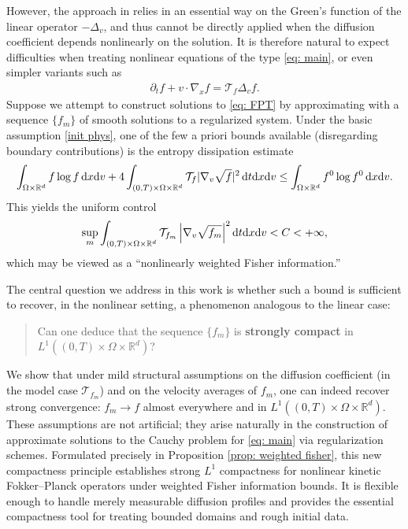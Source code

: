 \documentclass[10pt, reqno]{amsart}
\theoremstyle{plain}
\theoremstyle{definition}
\theoremstyle{remark}
\numberwithin{equation}{section}
\newcommand{\calT}{\mathcal T}
\newcommand{\p}{\partial}
\newcommand{\R}{\mathbb{R}}
\newcommand{\dx}{\textnormal{d}x}
\newcommand{\dv}{\textnormal{d}v}
\newcommand{\dt}{\textnormal{d}t}
\newcommand{\lt}{\left}
\newcommand{\rt}{\right}
\begin{document}
However, the approach in \cite{DL88FKB} relies in an essential way on the Green's function of the linear operator $-\Delta_v$, and thus cannot be directly applied when the diffusion coefficient depends nonlinearly on the solution. It is therefore natural to expect difficulties when treating nonlinear equations of the type \eqref{eq: main}, or even simpler variants such as
\begin{align}\label{eq: FPT}
    \p_t f + v\cdot \nabla_x f = \calT_f \Delta_v f.
\end{align}
Suppose we attempt to construct solutions to \eqref{eq: FPT} by approximating with a sequence $\{f_m\}$ of smooth solutions to a regularized system. Under the basic assumption \eqref{init phys}, one of the few a priori bounds available (disregarding boundary contributions) is the entropy dissipation estimate
\[
    \int_{\Omega\times\R^d} f\log f \,\dx\dv + 4 \int_{(0,T)\times\Omega\times\R^d} \calT_f |\nabla_v \sqrt{f}|^2 \,\dt\dx\dv \le \int_{\Omega\times\R^d} f^0 \log f^0 \,\dx\dv.
\]
This yields the uniform control
\[
    \sup_m \int_{(0,T)\times\Omega\times\R^d} \calT_{f_m} \lt|\nabla_v \sqrt{f_m} \rt|^2 \dt\dx\dv < C < +\infty,
\]
which may be viewed as a ``nonlinearly weighted Fisher information.''

The central question we address in this work is whether such a bound is sufficient to recover, in the nonlinear setting, a phenomenon analogous to the linear case:
\begin{quote}
Can one deduce that the sequence $\{f_m\}$ is \textbf{strongly compact} in $L^1((0,T)\times\Omega\times\R^d)$?
\end{quote}
 
We show that under mild structural assumptions on the diffusion coefficient (in the model case $\calT_{f_m}$) and on the velocity averages of $f_m$, one can indeed recover strong convergence: $f_m \to f$ almost everywhere and in $L^1((0,T)\times \Omega \times \R^d)$. These assumptions are not artificial; they arise naturally in the construction of approximate solutions to the Cauchy problem for \eqref{eq: main} via regularization schemes. Formulated precisely in Proposition \ref{prop: weighted fisher}, this new compactness principle establishes strong $L^1$ compactness for nonlinear kinetic Fokker--Planck operators under weighted Fisher information bounds. It is flexible enough to handle merely measurable diffusion profiles and provides the essential compactness tool for treating bounded domains and rough initial data.
\end{document}
